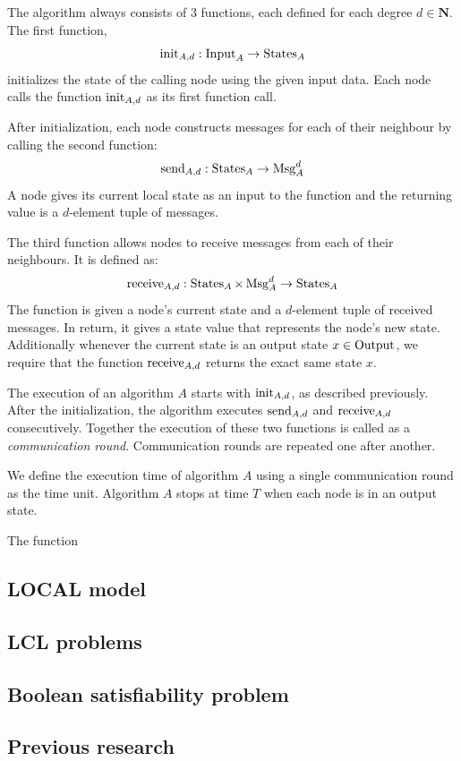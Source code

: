 The algorithm always consists of 3 functions, each defined for each degree $d \in \mathbf{N}$.
The first function, $$\operatorname{init}_{A,d} : \operatorname{Input}_A \rightarrow \operatorname{States}_A$$ initializes the state of the calling node using the given input data.
Each node calls the function $\operatorname{init}_{A,d}$ as its first function call.

After initialization, each node constructs messages for each of their neighbour by calling the second function:
$$\operatorname{send}_{A,d} : \operatorname{States}_A \rightarrow \operatorname{Msg}_A^d$$
A node gives its current local state as an input to the function and the returning value is a $d$-element tuple of messages.

The third function allows nodes to receive messages from each of their neighbours.
It is defined as:
$$\operatorname{receive}_{A,d} : \operatorname{States}_A \times \operatorname{Msg}_A^d \rightarrow \operatorname{States}_A$$
The function is given a node's current state and a $d$-element tuple of received messages.
In return, it gives a state value that represents the node's new state.
Additionally whenever the current state is an output state $x \in \operatorname{Output}$, we require that the function $\operatorname{receive}_{A,d}$ returns the exact same state $x$.

The execution of an algorithm $A$ starts with $\operatorname{init}_{A,d}$, as described previously.
After the initialization, the algorithm executes $\operatorname{send}_{A,d}$ and $\operatorname{receive}_{A,d}$ consecutively.
Together the execution of these two functions is called as a \emph{communication round}.
Communication rounds are repeated one after another.

We define the execution time of algorithm $A$ using a single communication round as the time unit.
Algorithm $A$ stops at time $T$ when each node is in an output state.





The function 







\subsection{LOCAL model} \label{sec:local_model}

\subsection{LCL problems} \label{sec:lcl_problems}

\subsection{Boolean satisfiability problem}

\subsection{Previous research} \label{sec:previous_research}


\clearpage

